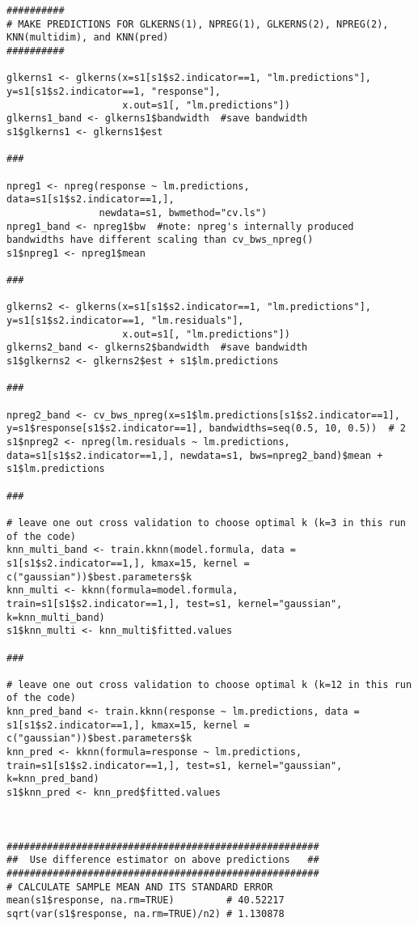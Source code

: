 \documentclass[a4paper,12pt,leqno, titlepage]{article}
\begin{document}
\begin{appendix}
{{{{\begin{verbatim}
##########
# MAKE PREDICTIONS FOR GLKERNS(1), NPREG(1), GLKERNS(2), NPREG(2), KNN(multidim), and KNN(pred)
##########

glkerns1 <- glkerns(x=s1[s1$s2.indicator==1, "lm.predictions"], y=s1[s1$s2.indicator==1, "response"],
                    x.out=s1[, "lm.predictions"])
glkerns1_band <- glkerns1$bandwidth  #save bandwidth
s1$glkerns1 <- glkerns1$est

###

npreg1 <- npreg(response ~ lm.predictions, data=s1[s1$s2.indicator==1,],
                newdata=s1, bwmethod="cv.ls")
npreg1_band <- npreg1$bw  #note: npreg's internally produced bandwidths have different scaling than cv_bws_npreg()
s1$npreg1 <- npreg1$mean

###

glkerns2 <- glkerns(x=s1[s1$s2.indicator==1, "lm.predictions"], y=s1[s1$s2.indicator==1, "lm.residuals"],
                    x.out=s1[, "lm.predictions"])
glkerns2_band <- glkerns2$bandwidth  #save bandwidth
s1$glkerns2 <- glkerns2$est + s1$lm.predictions

###

npreg2_band <- cv_bws_npreg(x=s1$lm.predictions[s1$s2.indicator==1], y=s1$response[s1$s2.indicator==1], bandwidths=seq(0.5, 10, 0.5))  # 2
s1$npreg2 <- npreg(lm.residuals ~ lm.predictions, data=s1[s1$s2.indicator==1,], newdata=s1, bws=npreg2_band)$mean + s1$lm.predictions

###

# leave one out cross validation to choose optimal k (k=3 in this run of the code)
knn_multi_band <- train.kknn(model.formula, data = s1[s1$s2.indicator==1,], kmax=15, kernel = c("gaussian"))$best.parameters$k
knn_multi <- kknn(formula=model.formula, train=s1[s1$s2.indicator==1,], test=s1, kernel="gaussian", k=knn_multi_band)
s1$knn_multi <- knn_multi$fitted.values

###

# leave one out cross validation to choose optimal k (k=12 in this run of the code)
knn_pred_band <- train.kknn(response ~ lm.predictions, data = s1[s1$s2.indicator==1,], kmax=15, kernel = c("gaussian"))$best.parameters$k
knn_pred <- kknn(formula=response ~ lm.predictions, train=s1[s1$s2.indicator==1,], test=s1, kernel="gaussian", k=knn_pred_band)
s1$knn_pred <- knn_pred$fitted.values



######################################################
##  Use difference estimator on above predictions   ##
######################################################
# CALCULATE SAMPLE MEAN AND ITS STANDARD ERROR
mean(s1$response, na.rm=TRUE)         # 40.52217
sqrt(var(s1$response, na.rm=TRUE)/n2) # 1.130878



\end{verbatim}}}}}
\end{appendix}
\end{document}
